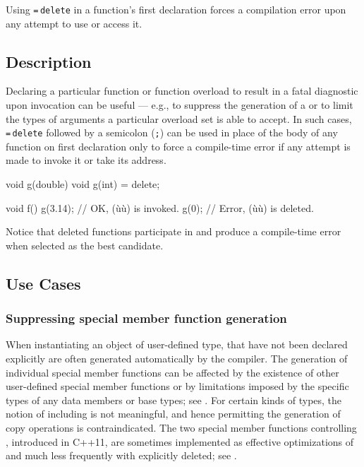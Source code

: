 Using \lstinline!=!\,\lstinline!delete! in a function's first declaration
forces a compilation error upon any attempt to use or access it.

\subsection[Description]{Description}\label{description}

Declaring a particular function or function overload to result in a
fatal diagnostic upon invocation can be useful --- e.g., to suppress the
generation of a  or to limit the types of
arguments a particular overload set is able to accept. In such cases,
\lstinline!=!\,\lstinline!delete! followed by a semicolon (\lstinline!;!) can be used in place of the body of any
function on first declaration only to force a compile-time error if
any attempt is made to invoke it or take its address.

\begin{emcppslisting}
void g(double) { }
void g(int) = delete;

void f()
{
    g(3.14);  // OK, (ù{}ù) is invoked.
    g(0);     // Error, (ù{}ù) is deleted.
}
\end{emcppslisting}

\noindent Notice that deleted functions participate in 
and produce a compile-time error when selected as the best candidate.

\subsection[Use Cases]{Use Cases}\label{use-cases}

\subsubsection[Suppressing special member function generation]{Suppressing special member function generation}\label{suppressing-special-member-function-generation}

When instantiating an object of user-defined type,  that have not been declared explicitly are
often generated automatically by the compiler.
The generation of individual special member
functions can be affected by the existence of other user-defined special
member functions or by limitations imposed by the specific types of
any data members or base types; see
. For certain kinds of types, the notion of 
including  is not meaningful, and
hence permitting the generation of copy operations is contraindicated. The two special member functions controlling , introduced in C++11, are sometimes implemented as effective optimizations of  and much less frequently with  explicitly deleted; see .

